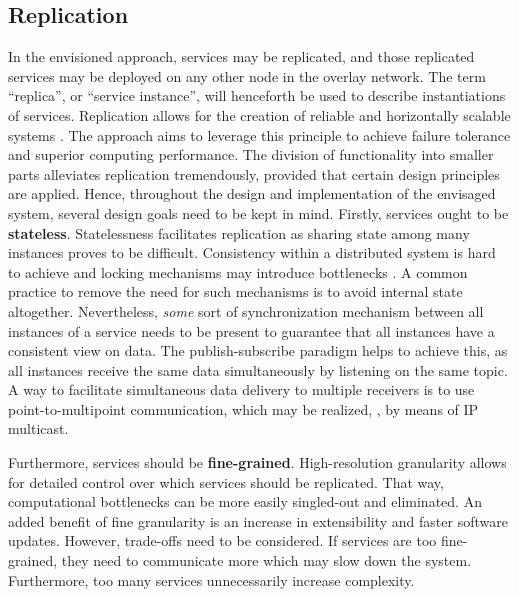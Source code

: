 \subsection{Replication}
In the envisioned approach, services may be replicated, and those replicated services may be deployed on any other node in the overlay network. The term ``replica'', or ``service instance'', will henceforth be used to describe instantiations of services. Replication allows for the creation of reliable and horizontally scalable systems \cite{tanenbaum2017distributed}. The approach aims to leverage this principle to achieve failure tolerance and superior computing performance.
The division of functionality into smaller parts alleviates replication tremendously, provided that certain design principles are applied. Hence, throughout the design and implementation of the envisaged system, several design goals need to be kept in mind. Firstly, services ought to be \textbf{stateless}. Statelessness facilitates replication as sharing state among many instances proves to be difficult. Consistency within a distributed system is hard to achieve and locking mechanisms may introduce bottlenecks \cite{tanenbaum2017distributed}. A common practice to remove the need for such mechanisms is to avoid internal state altogether. 
Nevertheless, \emph{some} sort of synchronization mechanism between all instances of a service needs to be present to guarantee that all instances have a consistent view on data. The publish-subscribe paradigm helps to achieve this, as all instances receive the same data simultaneously by listening on the same topic. A way to facilitate simultaneous data delivery to multiple receivers is to use point-to-multipoint communication, which may be realized, \eg , by means of IP multicast.

Furthermore, services should be \textbf{fine-grained}. High-resolution granularity allows for detailed control over which services should be replicated. That way, computational bottlenecks can be more easily singled-out and eliminated. An added benefit of fine granularity is an increase in extensibility and faster software updates. However, trade-offs need to be considered. If services are too fine-grained, they need to communicate more which may slow down the system. Furthermore, too many services unnecessarily increase complexity.

